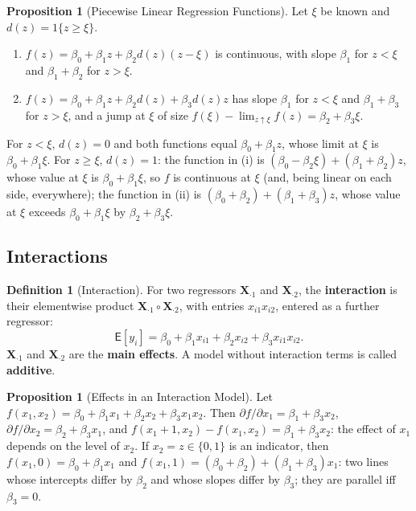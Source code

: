 \documentclass[12pt,a4paper]{article}
\makeatletter
\theoremstyle{definition}
\newtheorem{definition}[theorem]{Definition}
\newtheorem{proposition}[theorem]{Proposition}
\renewenvironment{proof}[1][\proofname]{\par
  \pushQED{\qed}%
  \normalfont \topsep6\p@\@plus6\p@\relax
  \trivlist
  \item[\hskip\labelsep\bfseries #1\@addpunct{.}]\ignorespaces
}{%
  \popQED\endtrivlist\@endpefalse
}
\newcommand\expc{\mathsf{E}}
\newcommand{\bX}{\mathbf{X}}
\makeatother
\begin{document}
\begin{proposition}[Piecewise Linear Regression Functions]\label{prop:piecewise}
Let $\xi$ be known and $d(z) = 1\{z \geqslant \xi\}$.
\begin{enumerate}[label=\textup{(\roman*)}]
\item $f(z) = \beta_0 + \beta_1z + \beta_2d(z)(z - \xi)$ is continuous, with slope $\beta_1$ for $z < \xi$ and $\beta_1 + \beta_2$ for $z > \xi$.
\item $f(z) = \beta_0 + \beta_1z + \beta_2d(z) + \beta_3d(z)z$ has slope $\beta_1$ for $z < \xi$ and $\beta_1 + \beta_3$ for $z > \xi$, and a jump at $\xi$ of size $f(\xi) - \lim_{z \uparrow \xi}f(z) = \beta_2 + \beta_3\xi$.
\end{enumerate}
\end{proposition}

\begin{proof}
For $z < \xi$, $d(z) = 0$ and both functions equal $\beta_0 + \beta_1z$, whose limit at $\xi$ is $\beta_0 + \beta_1\xi$. For $z \geqslant \xi$, $d(z) = 1$: the function in (i) is $(\beta_0 - \beta_2\xi) + (\beta_1 + \beta_2)z$, whose value at $\xi$ is $\beta_0 + \beta_1\xi$, so $f$ is continuous at $\xi$ (and, being linear on each side, everywhere); the function in (ii) is $(\beta_0 + \beta_2) + (\beta_1 + \beta_3)z$, whose value at $\xi$ exceeds $\beta_0 + \beta_1\xi$ by $\beta_2 + \beta_3\xi$.
\end{proof}

\subsection{Interactions}

\begin{definition}[Interaction]\label{def:interaction}
For two regressors $\bX_{\cdot 1}$ and $\bX_{\cdot 2}$, the \textbf{interaction} is their elementwise product $\bX_{\cdot 1} \circ \bX_{\cdot 2}$, with entries $x_{i1}x_{i2}$, entered as a further regressor:
\[
\expc[y_i] = \beta_0 + \beta_1x_{i1} + \beta_2x_{i2} + \beta_3x_{i1}x_{i2}.
\]
$\bX_{\cdot 1}$ and $\bX_{\cdot 2}$ are the \textbf{main effects}. A model without interaction terms is called \textbf{additive}.
\end{definition}

\begin{proposition}[Effects in an Interaction Model]\label{prop:interaction}
Let $f(x_1, x_2) = \beta_0 + \beta_1x_1 + \beta_2x_2 + \beta_3x_1x_2$. Then $\partial f/\partial x_1 = \beta_1 + \beta_3x_2$, $\partial f/\partial x_2 = \beta_2 + \beta_3x_1$, and $f(x_1 + 1, x_2) - f(x_1, x_2) = \beta_1 + \beta_3x_2$: the effect of $x_1$ depends on the level of $x_2$. If $x_2 = z \in \{0, 1\}$ is an indicator, then $f(x_1, 0) = \beta_0 + \beta_1x_1$ and $f(x_1, 1) = (\beta_0 + \beta_2) + (\beta_1 + \beta_3)x_1$: two lines whose intercepts differ by $\beta_2$ and whose slopes differ by $\beta_3$; they are parallel iff $\beta_3 = 0$.
\end{proposition}
\end{document}
